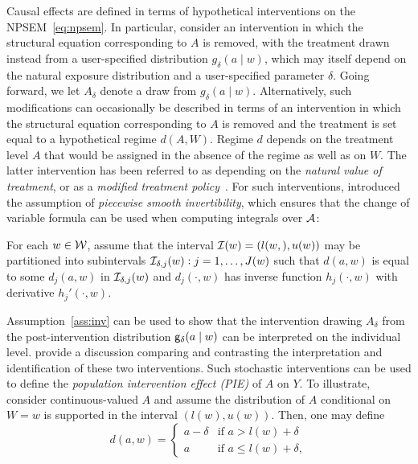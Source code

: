 Causal effects are defined in terms of hypothetical interventions on the
NPSEM~\eqref{eq:npsem}. In particular, consider an intervention in which the
structural equation corresponding to $A$ is removed, with the treatment drawn
instead from a user-specified distribution $g_\delta(a \mid w)$, which may
itself depend on the natural exposure distribution and a user-specified
parameter $\delta$. Going forward, we let $A_\delta$ denote a draw from
$g_\delta(a \mid w)$. Alternatively, such modifications can occasionally be
described in terms of an intervention in which the structural equation
corresponding to $A$ is removed and the treatment is set equal to a hypothetical
regime $d(A, W)$. Regime $d$ depends on the treatment level $A$ that would be
assigned in the absence of the regime as well as on $W$. The latter intervention
has been referred to as depending on the \textit{natural value of treatment}, or
as a \textit{modified treatment policy}~\citep{haneuse2013estimation}. For such
interventions, \citet{haneuse2013estimation} introduced the assumption of
\textit{piecewise smooth invertibility}, which ensures that the change of
variable formula can be used when computing integrals over $\cal A$:
\begin{assumptioniden}\label{ass:inv}
  For each $w \in \cal W$, assume that the interval
  ${\cal I}(w) = (l(w,), u(w))$ may be partitioned into subintervals
  ${\cal I}_{\delta,j}(w):j = 1, \ldots, J(w)$ such that $d(a, w)$ is equal to
  some $d_j(a, w)$ in ${\cal I}_{\delta,j}(w)$ and $d_j(\cdot,w)$ has inverse
  function $h_j(\cdot, w)$ with derivative $h_j'(\cdot, w)$.
\end{assumptioniden}
Assumption~\ref{ass:inv} can be used to show that the intervention drawing
$A_{\delta}$ from the post-intervention distribution $\mathsf{g}_\delta(a \mid w)$ can
be interpreted on the individual level. \citet{young2014identification} provide
a discussion comparing and contrasting the interpretation and identification of
these two interventions. Such stochastic interventions can be used to define the
\textit{population intervention effect (PIE)} of $A$ on $Y$. To illustrate,
consider continuous-valued $A$ and assume the distribution of $A$ conditional on
$W = w$ is supported in the interval $(l(w), u(w))$. Then, one may define
\begin{equation}\label{eq:defdshift}
  d(a, w) =
  \begin{cases}
    a - \delta & \text{if } a > l(w) + \delta \\
    a & \text{if } a \leq l(w) + \delta,
  \end{cases}
\end{equation}
